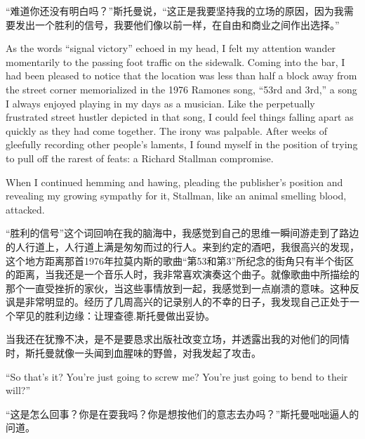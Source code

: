 \ifdefined\chs
“难道你还没有明白吗？”斯托曼说，“这正是我要坚持我的立场的原因，因为我需要发出一个胜利的信号，我要他们像以前一样，在自由和商业之间作出选择。”
\fi

\ifdefined\eng
As the words ``signal victory'' echoed in my head, I felt my attention wander momentarily to the passing foot traffic on the sidewalk. Coming into the bar, I had been pleased to notice that the location was less than half a block away from the street corner memorialized in the 1976 Ramones song, ``53rd and 3rd,'' a song I always enjoyed playing in my days as a musician. Like the perpetually frustrated street hustler depicted in that song, I could feel things falling apart as quickly as they had come together. The irony was palpable. After weeks of gleefully recording other people's laments, I found myself in the position of trying to pull off the rarest of feats: a Richard Stallman compromise. 

When I continued hemming and hawing, pleading the publisher's position and revealing my growing sympathy for it, Stallman, like an animal smelling blood, attacked. 
\fi

\ifdefined\chs
“胜利的信号”这个词回响在我的脑海中，我感觉到自己的思维一瞬间游走到了路边的人行道上，人行道上满是匆匆而过的行人。来到约定的酒吧，我很高兴的发现，这个地方距离那首1976年拉莫内斯的歌曲“第53和第3”所纪念的街角只有半个街区的距离，当我还是一个音乐人时，我非常喜欢演奏这个曲子。就像歌曲中所描绘的那个一直受挫折的家伙，当这些事情放到一起，我感觉到一点崩溃的意味。这种反讽是非常明显的。经历了几周高兴的记录别人的不幸的日子，我发现自己正处于一个罕见的胜利边缘：让理查德.斯托曼做出妥协。

当我还在犹豫不决，是不是要恳求出版社改变立场，并透露出我的对他们的同情时，斯托曼就像一头闻到血腥味的野兽，对我发起了攻击。
\fi

\ifdefined\eng
``So that's it? You're just going to screw me? You're just going to bend to their will?''
\fi

\ifdefined\chs
“这是怎么回事？你是在耍我吗？你是想按他们的意志去办吗？”斯托曼咄咄逼人的问道。
\fi


